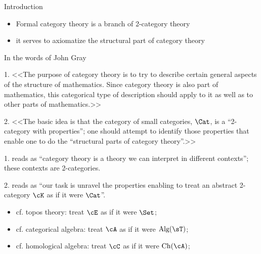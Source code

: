 \documentclass{beamer}
\begin{document}
\begin{frame}
	\centering\Huge Introduction
\end{frame}
\begin{frame}
	\begin{itemize}
		\item Formal category theory is a branch of 2-category theory
		\item it serves to axiomatize the \alert{structural part} of category theory
	\end{itemize}
	In the words of John Gray
	\begin{block}{1.}
		<<The purpose of category theory is to try to describe certain general
		aspects of the structure of mathematics. Since category theory
		is also part of mathematics, this categorical type of description
		should apply to it as well as to other parts of mathematics.>>
	\end{block}
	\begin{block}{2.}
		<<The basic idea is that the category of small categories, $\Cat$, is a ``2-category with properties''; one should attempt to identify those properties that enable one
		to do the ``structural parts of category theory''.>>
	\end{block}
\end{frame}

\begin{frame}
	1. reads as ``category theory is a theory we can interpret in different contexts''; these contexts are 2-categories.\onslide<2->

	2. reads as ``our task is unravel the properties enabling to treat an abstract 2-category $\cK$ as if it were $\Cat$''.

	\vspace*{1cm}
	\begin{itemize}
		\item cf. topos theory: treat $\cE$ as if it were $\Set$;
		\item cf. categorical algebra: treat $\cA$ as if it were $\text{Alg}(\sT)$;
		\item cf. homological algebra: treat $\cC$ as if it were $\text{Ch}(\cA)$;
	\end{itemize}
\end{frame}
\end{document}
